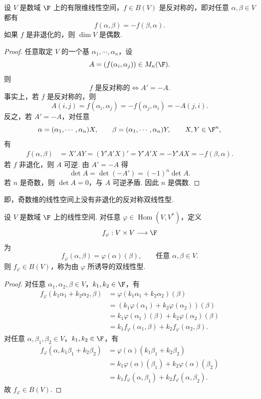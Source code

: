 \begin{example}
	设 $V$ 是数域 $\F$ 上的有限维线性空间，$f\in B(V)$ 是反对称的，即对任意 $\alpha,\beta\in V$ 都有
	\[
	f(\alpha,\beta)=-f(\beta,\alpha).
	\]
	如果 $f$ 是非退化的，则 $\dim V$ 是偶数.
\end{example}
\begin{proof}
	任意取定 $V$ 的一个基 $\alpha_1,\cdots,\alpha_n$，设
	\[
	A=(f(\alpha_i,\alpha_j))\in M_n(\F).
	\]
	则
	\[
	f\text{ 是反对称的}\Longleftrightarrow A'=-A.
	\]
	事实上，若 $f$ 是反对称的，则
	\[
	A(i,j)=f(\alpha_i,\alpha_j)=-f(\alpha_j,\alpha_i)=-A(j,i).
	\]
	反之，若 $A'=-A$，对任意
	\[
	\alpha=(\alpha_1,	\cdots,\alpha_n)X,
	\qquad
	\beta=(\alpha_1,	\cdots,\alpha_n)Y,
	\qquad X,Y\in\F^n,
	\]
	有
	\[
	\begin{aligned}
		f(\alpha,\beta)&=X'AY=(Y'A'X)'=Y'A'X=-Y'AX=-f(\beta,\alpha).
	\end{aligned}
	\]
	若 $f$ 非退化，则 $A$ 可逆. 由 $A'=-A$ 得
	\[
	\det A=\det(-A')=(-1)^n\det A.
	\]
	若 $n$ 是奇数，则 $\det A=0$，与 $A$ 可逆矛盾. 因此 $n$ 是偶数.
\end{proof}
即，奇数维的线性空间上没有非退化的反对称双线性型.
\begin{lemma}
	设 $V$ 是数域 $\F$ 上的线性空间. 对任意 $\varphi\in\operatorname{Hom}(V,V^*)$，定义
	\[
	f_\varphi:V\times V\longrightarrow \F
	\]
	为
	\[
	f_\varphi(\alpha,\beta)=\varphi(\alpha)(\beta),\qquad \text{任意 }\alpha,\beta\in V.
	\]
	\label{p1:concept:c7-l583}则 $f_\varphi\in B(V)$，称为由 $\varphi$ 所诱导的双线性型.
\end{lemma}
\begin{proof}
	对任意 $\alpha_1,\alpha_2,\beta\in V$，$k_1,k_2\in\F$，有
	\[
	\begin{aligned}
		f_\varphi(k_1\alpha_1+k_2\alpha_2,\beta)
		&=\varphi(k_1\alpha_1+k_2\alpha_2)(\beta)\\
		&=(k_1\varphi(\alpha_1)+k_2\varphi(\alpha_2))(\beta)\\
		&=k_1\varphi(\alpha_1)(\beta)+k_2\varphi(\alpha_2)(\beta)\\
		&=k_1f_\varphi(\alpha_1,\beta)+k_2f_\varphi(\alpha_2,\beta).
	\end{aligned}
	\]
	对任意 $\alpha,\beta_1,\beta_2\in V$，$k_1,k_2\in\F$，有
	\[
	\begin{aligned}
		f_\varphi(\alpha,k_1\beta_1+k_2\beta_2)
		&=\varphi(\alpha)(k_1\beta_1+k_2\beta_2)\\
		&=k_1\varphi(\alpha)(\beta_1)+k_2\varphi(\alpha)(\beta_2)\\
		&=k_1f_\varphi(\alpha,\beta_1)+k_2f_\varphi(\alpha,\beta_2).
	\end{aligned}
	\]
	故 $f_\varphi\in B(V)$.
\end{proof}
